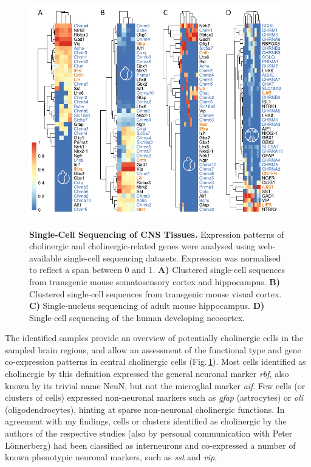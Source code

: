 \begin{figure}[ht]
\centering
\includegraphics[height=10cm]{figures/singlecell}
\caption[Single-Cell Sequencing of CNS Tissues.]{\textbf{Single-Cell Sequencing of CNS Tissues.} Expression patterns of cholinergic and cholinergic-related genes were analysed using web-available single-cell sequencing datasets. Expression was normalised to reflect a span between 0 and 1. \textbf{A)} Clustered single-cell sequences from transgenic mouse somatosensory cortex and hippocampus.\cite{Zeisel2015} \textbf{B)} Clustered single-cell sequences from transgenic mouse visual cortex.\cite{Tasic2016} \textbf{C)} Single-nucleus sequencing of adult mouse hippocampus.\cite{Habib2016} \textbf{D)} Single-cell sequencing of the human developing neocortex.\cite{Darmanis2015} 
\label{fig:singlecell}}
\end{figure}

The identified samples provide an overview of potentially cholinergic cells in the sampled brain regions, and allow an assessment of the functional type and gene co-expression patterns in central cholinergic cells (Fig.\,\ref{fig:singlecell}). Most cells identified as cholinergic by this definition expressed the general neuronal marker \textit{\acs{rbf}}, also known by its trivial name NeuN, but not the microglial marker \textit{\acs{aif}}. Few cells (or clusters of cells) expressed non-neuronal markers such as \textit{\acs{gfap}} (astrocytes) or \textit{\acs{oli}} (oligodendrocytes), hinting at sparse non-neuronal cholinergic functions. In agreement with my findings, cells or clusters identified as cholinergic by the authors of the respective studies\cite{Zeisel2015, Tasic2016} (also by personal communication with Peter Lönnerberg) had been classified as interneurons and co-expressed a number of known phenotypic neuronal markers, such as \textit{\ac{sst}} and \textit{\ac{vip}}.

